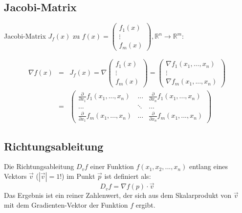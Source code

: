 \subsection{Jacobi-Matrix} %
\label{sub:jacobi_matrix}
Jacobi-Matrix $J_f(x)$ zu $f(x) = \left( \begin{array}{c}f_1(x)\\\vdots\\f_m(x)\end{array}\right), 
\mathbb{R}^n \rightarrow \mathbb{R}^m$:

\begin{eqnarray}
	\nabla f(x) &=& J_f(x)  = \nabla \left( \begin{array}{c}f_1(x)\\\vdots\\f_m(x)\end{array}\right) 
	= \left( \begin{array}{c} \nabla f_1(x_1,...,x_n) \\ \vdots \\ \nabla f_m(x_1,...,x_n) \end{array} \right) \\
	&=& \left( \begin{array}{ccc} 
			\frac{\partial}{\partial x_1}f_1(x_1,...,x_n) & ... & \frac{\partial}{\partial x_n}f_1(x_1,...,x_n) \\
			... & \ddots & ... \\
			\frac{\partial}{\partial x_1}f_m(x_1,...,x_n) & ... & \frac{\partial}{\partial x_n}f_m(x_1,...,x_n)
		\end{array}\right)
\end{eqnarray}


\subsection{Richtungsableitung} %
\label{sub:richtungsableitung}

Die Richtungsableitung $D_vf$ einer Funktion $f(x_1,x_2,...,x_n)$ entlang 
eines Vektors $\overrightarrow{v}$ ($|\overrightarrow{v}| = 1$!) 
im Punkt $\overrightarrow{p}$ ist definiert als:
\begin{equation}
	D_vf = \nabla f(p) \cdot \overrightarrow{v}
\end{equation}
Das Ergebnis ist ein reiner Zahlenwert, der sich aus dem Skalarprodukt von $\overrightarrow{v}$ mit dem Gradienten-Vektor
der Funktion $f$ ergibt.

